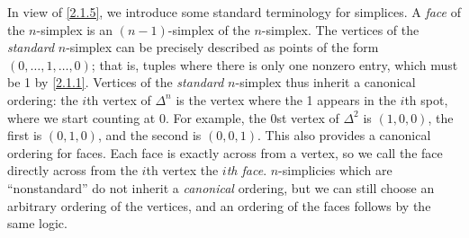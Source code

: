 \begin{terminology}\label{2.1.6}
    In view of \cref{2.1.5}, we introduce some standard terminology for simplices. A \emph{face} of the $n$-simplex is an $(n-1)$-simplex of the $n$-simplex. The vertices of the \emph{standard} $n$-simplex can be precisely described as points of the form $(0,\ldots,1,\ldots,0)$; that is, tuples where there is only one nonzero entry, which must be 1 by \cref{2.1.1}. Vertices of the \emph{standard} $n$-simplex thus inherit a canonical ordering: the $i$th vertex of $\Delta^n$ is the vertex where the 1 appears in the $i$th spot, where we start counting at 0. For example, the 0st vertex of $\Delta^2$ is $(1,0,0)$, the first is $(0,1,0)$, and the second is $(0,0,1)$. This also provides a canonical ordering for faces. Each face is exactly across from a vertex, so we call the face directly across from the $i$th vertex the \emph{$i$th face}. $n$-simplicies which are ``nonstandard'' do not inherit a \emph{canonical} ordering, but we can still choose an arbitrary ordering of the vertices, and an ordering of the faces follows by the same logic.
\end{terminology}

